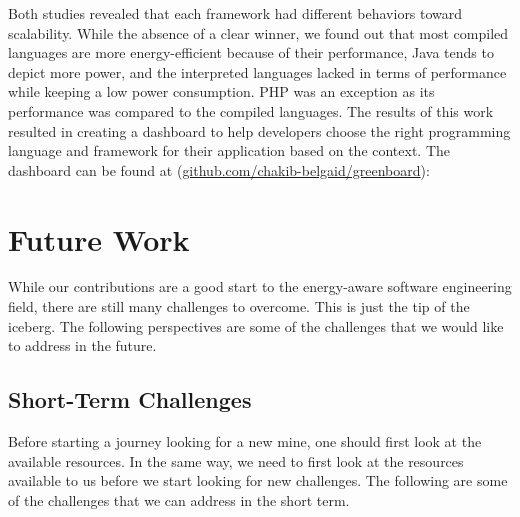 Both studies revealed that each framework had different behaviors toward scalability.
While the absence of a clear winner, we found out that most compiled languages are more energy-efficient because of their performance, Java tends to depict more power, and the interpreted languages lacked in terms of performance while keeping a low power consumption. PHP was an exception as its performance was compared to the compiled languages. 
The results of this work resulted in creating a dashboard to help developers choose the right programming language and framework for their application based on the context. The dashboard can be found at (\url{github.com/chakib-belgaid/greenboard}):




\section{Future Work}
While our contributions are a good start to the energy-aware software engineering field, there are still many challenges to overcome.
This is just the tip of the iceberg.
The following perspectives are some of the challenges that we would like to address in the future.

\subsection{Short-Term Challenges}
Before starting a journey looking for a new mine, one should first look at the available resources.
In the same way, we need to first look at the resources available to us before we start looking for new challenges.
The following are some of the challenges that we can address in the short term.


